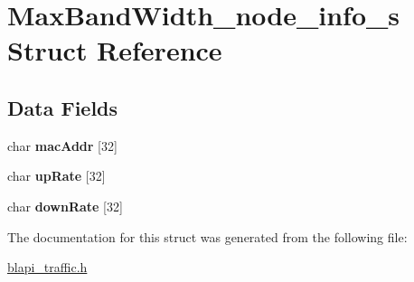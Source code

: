 \hypertarget{structMaxBandWidth__node__info__s}{}\section{Max\+Band\+Width\+\_\+node\+\_\+info\+\_\+s Struct Reference}
\label{structMaxBandWidth__node__info__s}
\subsection*{Data Fields}
\begin{DoxyCompactItemize}
\item 
\mbox{\label{structMaxBandWidth__node__info__s_ab4439fbbbe69d7d3ffaa3638f7bdb75b}} 
char {\bfseries mac\+Addr} \mbox{[}32\mbox{]}
\item 
\mbox{\label{structMaxBandWidth__node__info__s_add5649a48da85d057d66d85689c5921e}} 
char {\bfseries up\+Rate} \mbox{[}32\mbox{]}
\item 
\mbox{\label{structMaxBandWidth__node__info__s_a2b81f2ace1ede1d90157a5b43497b425}} 
char {\bfseries down\+Rate} \mbox{[}32\mbox{]}
\end{DoxyCompactItemize}


The documentation for this struct was generated from the following file\+:\begin{DoxyCompactItemize}
\item 
\hyperlink{blapi__traffic_8h}{blapi\+\_\+traffic.\+h}\end{DoxyCompactItemize}
